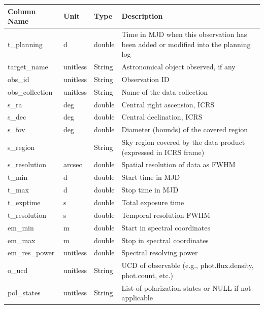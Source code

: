 \documentclass[11pt,a4paper]{ivoa}
\begin{document}
\begin{landscape}
\begin{table}
\begin{tabular}{ |l|l|l|l| }
\hline
\textbf{Column Name} & 
\textbf{Unit} & 
\textbf{Type} & 
\textbf{Description} \\
\hline
t\_planning & 
d & 
double & 
Time in MJD when this observation has been added or modified into the planning log \\
\hline
target\_name & 
unitless & 
String & 
Astronomical object observed, if any \\
\hline
obs\_id & 
unitless & 
String & 
Observation ID \\
\hline
obs\_collection & 
unitless & 
String & 
Name of the data collection \\
\hline
s\_ra & 
deg & 
double & 
Central right ascension, ICRS \\
\hline
s\_dec & 
deg  & 
double & 
Central declination, ICRS \\
\hline
s\_fov  & 
deg & 
double & 
Diameter (bounds) of the covered region \\
\hline
s\_region & 
& 
String & 
Sky region covered by the data product (expressed in ICRS frame) \\
\hline
s\_resolution & 
arcsec & 
double & 
Spatial resolution of data as FWHM \\
\hline
t\_min & 
d & 
double & 
Start time in MJD \\
\hline
t\_max & 
d & 
double & 
Stop time in MJD \\
\hline
t\_exptime & 
s & 
double & 
Total exposure time \\
\hline
t\_resolution & 
s & 
double & 
Temporal resolution FWHM \\
\hline
em\_min & 
m & 
double & 
Start in spectral coordinates \\
\hline
em\_max & 
m & 
double & 
Stop in spectral coordinates \\
\hline
em\_res\_power & 
unitless & 
double & 
Spectral resolving power \\
\hline
o\_ucd & 
unitless & 
String & 
UCD of observable (e.g., phot.flux.density, phot.count, etc.) \\
\hline
pol\_states & 
unitless & 
String & 
List of polarization states or NULL if not applicable \\

\end{tabular}
\end{table}
\end{landscape}
\end{document}
